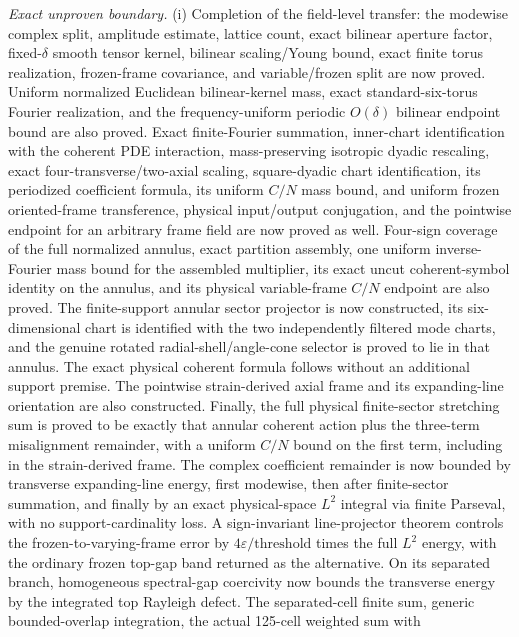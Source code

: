 \documentclass[11pt]{article}
\theoremstyle{definition}
\begin{document}
\emph{Exact unproven boundary.}  (i) Completion of the field-level transfer:
the modewise complex split, amplitude estimate, lattice count, exact
bilinear aperture factor, fixed-$\delta$ smooth tensor kernel, bilinear
scaling/Young bound, exact finite torus realization, frozen-frame covariance,
and variable/frozen split are now proved.  Uniform normalized Euclidean
bilinear-kernel mass, exact standard-six-torus Fourier realization, and the
frequency-uniform periodic $O(\delta)$ bilinear endpoint bound are also
proved.  Exact finite-Fourier summation, inner-chart identification with the
coherent PDE interaction, mass-preserving isotropic dyadic rescaling, exact
four-transverse/two-axial scaling, square-dyadic chart identification, its
periodized coefficient formula, its uniform $C/N$ mass bound, and uniform
frozen oriented-frame transference, physical input/output conjugation, and the
pointwise endpoint for an arbitrary frame field are now proved as well.
Four-sign coverage of the full normalized annulus, exact partition assembly,
one uniform inverse-Fourier mass bound for the assembled multiplier, its exact
uncut coherent-symbol identity on the annulus, and its physical
variable-frame $C/N$ endpoint are also proved.  The finite-support annular
sector projector is now constructed, its six-dimensional chart is identified
with the two independently filtered mode charts, and the genuine rotated
radial-shell/angle-cone selector is proved to lie in that annulus.  The exact
physical coherent formula follows without an additional support premise.  The
pointwise strain-derived axial frame and its expanding-line orientation are
also constructed.  Finally, the full
physical finite-sector stretching sum is proved to be exactly that annular
coherent action plus the three-term misalignment remainder, with a uniform
$C/N$ bound on the first term, including in the strain-derived frame.  The
complex coefficient remainder is now bounded by transverse expanding-line
energy, first modewise, then after finite-sector summation, and finally by an
exact physical-space $L^2$ integral via finite Parseval, with no
support-cardinality loss.  A sign-invariant line-projector theorem controls
the frozen-to-varying-frame error by
$4\varepsilon/\mathrm{threshold}$ times the full $L^2$ energy, with the
ordinary frozen top-gap band returned as the alternative.  On its separated
branch, homogeneous spectral-gap coercivity now bounds the transverse energy
by the integrated top Rayleigh defect.  The separated-cell finite sum,
generic bounded-overlap integration, the actual 125-cell weighted sum with
\end{document}
